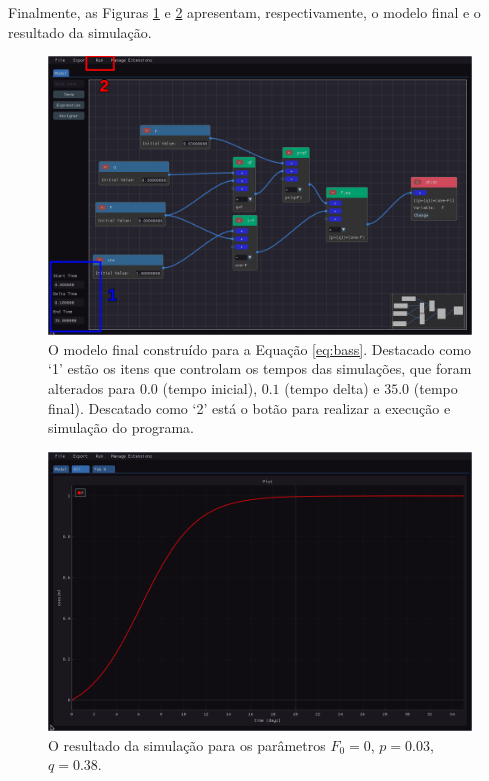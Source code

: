 \documentclass[
	12pt,				%
	openright,			%
	oneside,			%
	a4paper,			%
	main=brazil,
	english,			%
	]{ufsj-abntex2}
\begin{document}
Finalmente, as Figuras \ref{fig:modelo-final} e \ref{fig:resultado} apresentam, respectivamente, o modelo final e o resultado da simulação.

\begin{figure}[h]
    \centering
    \includegraphics[width=\textwidth]{imgs/ode-designer/passo-a-passo/modelo-final.png} 
    \caption{O modelo final construído para a Equação \ref{eq:bass}. Destacado como `1' estão os itens que controlam os tempos das simulações, que foram alterados para $0.0$ (tempo inicial), $0.1$ (tempo delta) e $35.0$ (tempo final). Descatado como `2' está o botão para realizar a execução e simulação do programa.}
    \label{fig:modelo-final}
\end{figure}

\begin{figure}[h]
    \centering
    \includegraphics[width=\textwidth]{imgs/ode-designer/passo-a-passo/resultado.png} 
    \caption{O resultado da simulação para os parâmetros $F_0 = 0$, $p = 0.03$, $q = 0.38$.}
    \label{fig:resultado}
\end{figure}
\end{document}
